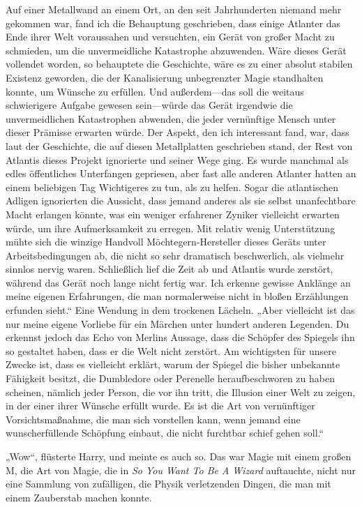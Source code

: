 Auf einer Metallwand an einem Ort, an den seit Jahrhunderten niemand mehr gekommen war, fand ich die Behauptung geschrieben, dass einige Atlanter das Ende ihrer Welt voraussahen und versuchten, ein Gerät von großer Macht zu schmieden, um die unvermeidliche Katastrophe abzuwenden. Wäre dieses Gerät vollendet worden, so behauptete die Geschichte, wäre es zu einer absolut stabilen Existenz geworden, die der Kanalisierung unbegrenzter Magie standhalten konnte, um Wünsche zu erfüllen. Und außerdem—das soll die weitaus schwierigere Aufgabe gewesen sein—würde das Gerät irgendwie die unvermeidlichen Katastrophen abwenden, die jeder vernünftige Mensch unter dieser Prämisse erwarten würde. Der Aspekt, den ich interessant fand, war, dass laut der Geschichte, die auf diesen Metallplatten geschrieben stand, der Rest von Atlantis dieses Projekt ignorierte und seiner Wege ging. Es wurde manchmal als edles öffentliches Unterfangen gepriesen, aber fast alle anderen Atlanter hatten an einem beliebigen Tag Wichtigeres zu tun, als zu helfen. Sogar die atlantischen Adligen ignorierten die Aussicht, dass jemand anderes als sie selbst unanfechtbare Macht erlangen könnte, was ein weniger erfahrener Zyniker vielleicht erwarten würde, um ihre Aufmerksamkeit zu erregen. Mit relativ wenig Unterstützung mühte sich die winzige Handvoll Möchtegern-Hersteller dieses Geräts unter Arbeitsbedingungen ab, die nicht so sehr dramatisch beschwerlich, als vielmehr sinnlos nervig waren. Schließlich lief die Zeit ab und Atlantis wurde zerstört, während das Gerät noch lange nicht fertig war. Ich erkenne gewisse Anklänge an meine eigenen Erfahrungen, die man normalerweise nicht in bloßen Erzählungen erfunden sieht.“
Eine Wendung in dem trockenen Lächeln.
„Aber vielleicht ist das nur meine eigene Vorliebe für ein Märchen unter hundert anderen Legenden. Du erkennst jedoch das Echo von Merlins Aussage, dass die Schöpfer des Spiegels ihn so gestaltet haben, dass er die Welt nicht zerstört. Am wichtigsten für unsere Zwecke ist, dass es vielleicht erklärt, warum der Spiegel die bisher unbekannte Fähigkeit besitzt, die Dumbledore oder Perenelle heraufbeschworen zu haben scheinen, nämlich jeder Person, die vor ihn tritt, die Illusion einer Welt zu zeigen, in der einer ihrer Wünsche erfüllt wurde. Es ist die Art von vernünftiger Vorsichtsmaßnahme, die man sich vorstellen kann, wenn jemand eine wunscherfüllende Schöpfung einbaut, die nicht furchtbar schief gehen soll.“

„Wow“, flüsterte Harry, und meinte es auch so. Das war Magie mit einem großen M, die Art von Magie, die in \emph{So You Want To Be A Wizard} auftauchte, nicht nur eine Sammlung von zufälligen, die Physik verletzenden Dingen, die man mit einem Zauberstab machen konnte.

